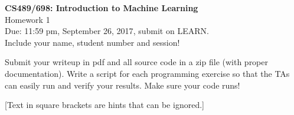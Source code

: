\documentclass[10pt,letter,notitlepage]{article}
\newcommand{\red}[1]{{\color{red}#1}}
\newcounter{exercise}
\begin{document}
\begin{center}
\large{\textbf{CS489/698: Introduction to Machine Learning} \\ Homework 1\\ \red{Due: 11:59 pm, September 26, 2017}, \red{submit on LEARN}.} \\

Include your name, student number and session!

\end{center}

\begin{center}
Submit your writeup in pdf and all source code in a zip file (with proper documentation). Write a script for each programming exercise so that the TAs can easily run and verify your results. Make sure your code runs!

[Text in square brackets are hints that can be ignored.]
\end{center}
\end{document}
